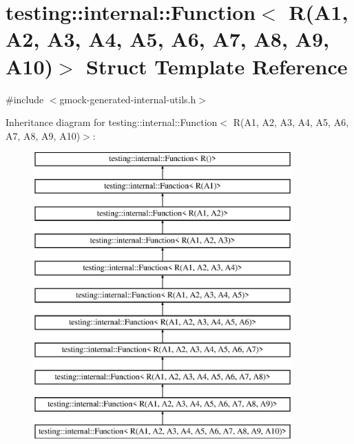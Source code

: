 \hypertarget{structtesting_1_1internal_1_1_function_3_01_r_07_a1_00_01_a2_00_01_a3_00_01_a4_00_01_a5_00_01_a6f6ff91550f0557b7708e490e5002cd35}{}\section{testing\+::internal\+::Function$<$ R(A1, A2, A3, A4, A5, A6, A7, A8, A9, A10)$>$ Struct Template Reference}
\label{structtesting_1_1internal_1_1_function_3_01_r_07_a1_00_01_a2_00_01_a3_00_01_a4_00_01_a5_00_01_a6f6ff91550f0557b7708e490e5002cd35}


{\ttfamily \#include $<$gmock-\/generated-\/internal-\/utils.\+h$>$}

Inheritance diagram for testing\+::internal\+::Function$<$ R(A1, A2, A3, A4, A5, A6, A7, A8, A9, A10)$>$\+:\begin{figure}[H]
\begin{center}
\leavevmode
\includegraphics[height=11.000000cm]{d3/d83/structtesting_1_1internal_1_1_function_3_01_r_07_a1_00_01_a2_00_01_a3_00_01_a4_00_01_a5_00_01_a6f6ff91550f0557b7708e490e5002cd35}
\end{center}
\end{figure}
